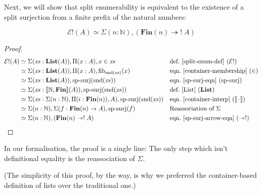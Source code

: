 Next, we will show that split enumerability is equivalent to the existence of a
split surjection from a finite prefix of the natural numbers:
\begin{lemma} \label{split-enum-is-split-surj}
  \begin{equation}
    \mathcal{E}!(A) \simeq \Sigma (n : \mathbb{N}) , \left( \mathbf{Fin}(n) \twoheadrightarrow ! \; A \right)
  \end{equation}
\end{lemma}
\begin{proof}
  \begin{align*}
     \mathcal{E}!(A) &
    \simeq \Sigma (\mathit{xs} : \textbf{List}(A)) , \Pi {(x : A)} , x \in \mathit{xs}
    && \text{def.~\ref{split-enum-def} }(\mathcal{E}!)
    \\
    & \simeq \Sigma (\mathit{xs} : \textbf{List}(A)) , \Pi {(x : A)} , \text{fib}_{\text{snd}(\mathit{xs})}(x)
    && \text{eqn.~\ref{container-membership} } (\in)
    \\
    & \simeq \Sigma (\mathit{xs} : \textbf{List}(A)) , \text{sp-surj}(\text{snd}(\mathit{xs}))
    && \text{eqn.~\ref{sp-surj-eqn} (sp-surj)}
    \\
    & \simeq \Sigma (\mathit{xs} : \llbracket \mathbb{N} , \mathbf{Fin} \rrbracket (A)) , \text{sp-surj}(\text{snd}(\mathit{xs}))
    && \text{def.~\ref{List} } (\mathbf{List})
    \\
    & \simeq \Sigma (\mathit{xs} : \Sigma (n : \mathbb{N}) , \Pi (i : \mathbf{Fin}(n)) , A) , \text{sp-surj}(\text{snd}(\mathit{xs}))
    && \text{eqn.~\ref{container-interp} } (\llbracket {\mkern 2mu\cdot\mkern 2mu} \rrbracket)
    \\
    & \simeq \Sigma (n : \mathbb{N}) , \Sigma (f : \mathbf{Fin}(n) \rightarrow A) , \text{sp-surj}(f)
    && \text{Reassociation of } \Sigma
    \\
    & \simeq \Sigma (n : \mathbb{N}) , ( \mathbf{Fin}(n) \twoheadrightarrow ! \; A )
    && \text{eqn.~\ref{sp-surj-arrow-eqn} } (\twoheadrightarrow!)
  \end{align*}
\end{proof}
\begin{agdalisting}
In our formalisation, the proof is a single line:
The only step which isn't definitional equality is the reassociation of
\(\Sigma\).
\end{agdalisting}
(The simplicity of this proof, by the way, is why we preferred the
container-based definition of lists over the traditional one.)

